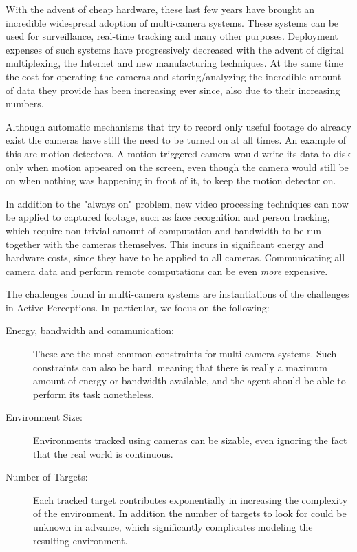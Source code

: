 With the advent of cheap hardware, these last few years have brought an incredible widespread
adoption of multi-camera systems. These systems can be  used for surveillance, real-time tracking and
many other purposes. Deployment expenses of such systems have progressively decreased with the
advent of digital multiplexing, the Internet and new manufacturing techniques. At the same time the
cost for operating the cameras and storing/analyzing the incredible amount of data they provide has
been increasing ever since, also due to their increasing numbers.

Although automatic mechanisms that try to record only useful footage do already exist the cameras
have still the need to be turned on at all times. An example of this are motion detectors. A motion
triggered camera would write its data to disk only when motion appeared on the screen, even though
the camera would still be on when nothing was happening in front of it, to keep the motion detector
on.

In addition to the "always on" problem, new video processing techniques can now be applied to
captured footage, such as face recognition and person tracking, which require non-trivial amount of
computation and bandwidth to be run together with the cameras themselves. This incurs in significant
energy and hardware costs, since they have to be applied to all cameras. Communicating all camera
data and perform remote computations can be even \textit{more} expensive.

The challenges found in multi-camera systems are instantiations of the challenges in Active
Perceptions. In particular, we focus on the following:

\begin{description}
\item[Energy, bandwidth and communication:] These are the most common constraints for multi-camera
    systems. Such constraints can also be hard, meaning that there is really a maximum amount of
    energy or bandwidth available, and the agent should be able to perform its task nonetheless.
\item[Environment Size:] Environments tracked using cameras can be sizable, even ignoring the fact
    that the real world is continuous.
\item[Number of Targets:] Each tracked target contributes exponentially in increasing the complexity
    of the environment. In addition the number of targets to look for could be unknown in advance,
    which significantly complicates modeling the resulting environment.
\end{description}

